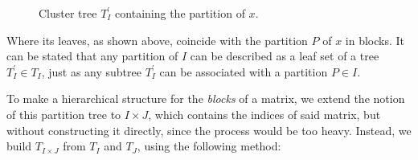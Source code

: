 \begin{figure}[!h]

    \centering

    \caption{Cluster tree $T_{I}^{'}$ containing the partition of $x$.}
    \label{fig:xcluster_tree}
\end{figure}

Where its leaves, as shown above, coincide with the partition $P$ of $x$ in blocks. It can be stated \cite{hackbusch2015hierarchical} that any partition of $I$ can be described as a leaf set of a tree $T^{'}_{I} \in T_{I}$, just as any subtree $T_{I}^{'}$ can be associated with a partition $P \in I$.

To make a hierarchical structure for the \textit{blocks} of a matrix, we extend the notion of this partition tree to $I \times J$, which contains the indices of said matrix, but without constructing it directly, since the process would be too heavy. Instead, we build $T_{I \times J}$ from $T_{I}$ and $T_{J}$, using the following method:

